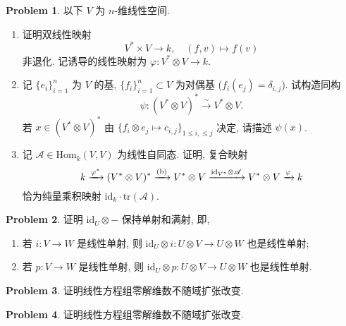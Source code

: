 \documentclass{MainStyle}
\theoremstyle{definition}
\newtheorem{problem}{Problem}
\begin{document}
\begin{problem}
以下 $V$ 为 $n$-维线性空间.
\begin{enumerate}
    \item 证明双线性映射
          \begin{equation}
              V^\ast \times V\to k,\quad (f,v)\mapsto f(v)
          \end{equation}
          非退化. 记诱导的线性映射为 $\varphi :V^\ast \otimes V\to k$.
    \item 记 $\{e_i\}_{i=1}^n$ 为 $V$ 的基, $\{f_i\}_{i=1}^n\subset V$ 为对偶基 ($f_i(e_j)=\delta_{i,j}$). 试构造同构
          \begin{equation}
              \psi: (V^\ast \otimes V)^\ast \xrightarrow \sim V^\ast\otimes V.
          \end{equation}
          若 $x\in (V^\ast\otimes V)^\ast$ 由 $\{f_i\otimes e_j\mapsto c_{i,j}\}_{1\leq i,\leq j}$ 决定, 请描述 $\psi(x)$.
    \item 记 $\mathscr A\in \mathrm{Hom}_k (V,V)$ 为线性自同态. 证明, 复合映射
          \begin{equation}
              k\xrightarrow{\varphi^\ast}(V^\ast \otimes V)^\ast\xrightarrow{\textup{(b)}} V^\ast\otimes V\xrightarrow{\mathrm{id}_{V^\ast}\otimes\mathscr A} V^\ast \otimes V\xrightarrow{\varphi} k
          \end{equation}
          恰为纯量乘积映射 $\mathrm{id}_k\cdot \mathrm{tr}(\mathscr A)$.
\end{enumerate}

\end{problem}


\begin{problem}
证明 $\mathrm{id}_U\otimes -$ 保持单射和满射, 即,
\begin{enumerate}
    \item 若 $i:V\to W$ 是线性单射, 则 $\mathrm{id}_U\otimes i:U\otimes V\to U\otimes W$ 也是线性单射;
    \item 若 $p:V\to W$ 是线性单射, 则 $\mathrm{id}_U\otimes p:U\otimes V\to U\otimes W$ 也是线性单射.
\end{enumerate}
\end{problem}

\begin{problem}
证明线性方程组零解维数不随域扩张改变.
\end{problem}

\begin{problem}
证明线性方程组零解维数不随域扩张改变.
\end{problem}
\end{document}
